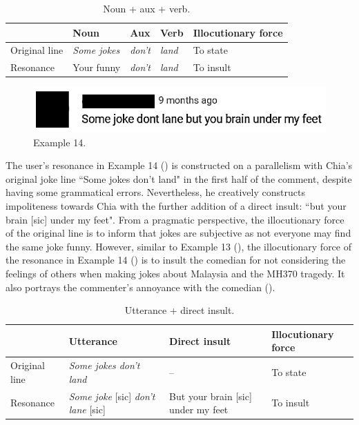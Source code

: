 \documentclass[english]{textolivre}
\begin{document}
\begin{table}[h!]
\centering
\begin{threeparttable}
\caption{Noun + aux + verb.}\label{tab-6}
\begin{tabular}{lllll}
\toprule
& Noun & Aux & Verb & Illocutionary force \\
\midrule
Original line & \emph{Some jokes} & \emph{don’t} & \emph{land} & To state \\
Resonance & Your funny & \emph{don’t} & \emph{land} & To insult \\
\bottomrule
\end{tabular}
\end{threeparttable}
\end{table}

\begin{figure}[h!]
    \centering
    \begin{minipage}{0.5\linewidth}
    \includegraphics[width=\linewidth]{imagens/exemplo14.png}
    \caption{Example 14.}\label{example-14}
    \end{minipage}
\end{figure}


The user’s resonance in Example 14 () is constructed on a parallelism with Chia’s original joke line ``Some jokes don’t land" in the first half of the comment, despite having some grammatical errors. Nevertheless, he creatively constructs impoliteness towards Chia with the further addition of a direct insult: ``but your brain [sic] under my feet". From a pragmatic perspective, the illocutionary force of the original line is to inform that jokes are subjective as not everyone may find the same joke funny. However, similar to Example 13 (), the illocutionary force of the resonance in Example 14 () is to insult the comedian for not considering the feelings of others when making jokes about Malaysia and the MH370 tragedy. It also portrays the commenter’s annoyance with the comedian ().

\begin{table}[h!]
\centering
\begin{threeparttable}
\caption{Utterance + direct insult.}\label{tab-7}
\begin{tabular}{p{2cm} p{3.5cm} p{4cm} p{3cm}}
\toprule
& Utterance & Direct insult & Illocutionary force \\
\midrule
Original line & \emph{Some jokes don’t land} & -- & To state \\
Resonance & \emph{Some joke} [sic] \emph{don’t lane} [sic] & But your brain [sic] under my feet & To insult \\
\bottomrule
\end{tabular}
\end{threeparttable}
\end{table}
\end{document}
